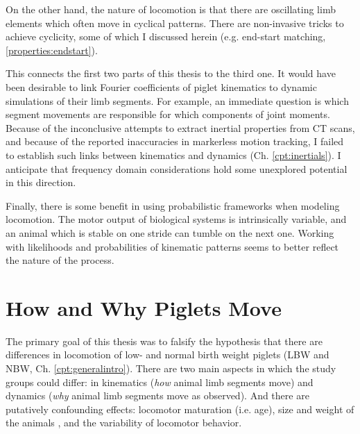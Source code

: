 \begin{change}
On the other hand, the nature of locomotion is that there are oscillating limb elements which often move in cyclical patterns.
There are non-invasive tricks to achieve cyclicity, some of which I discussed herein (e.g. end-start matching, \ref{properties:endstart}).


This connects the first two parts of this thesis to the third one.
It would have been desirable to link Fourier coefficients of piglet kinematics to dynamic simulations of their limb segments.
For example, an immediate question is which segment movements are responsible for which components of joint moments.
Because of the inconclusive attempts to extract inertial properties from CT scans, and because of the reported inaccuracies in markerless motion tracking, I failed to establish such links between kinematics and dynamics (Ch. \ref{cpt:inertials}).
I anticipate that frequency domain considerations hold some unexplored potential in this direction.


Finally, there is some benefit in using probabilistic frameworks when modeling locomotion.
The motor output of biological systems is intrinsically variable, and an animal which is stable on one stride can tumble on the next one.
Working with likelihoods and probabilities of kinematic patterns seems to better reflect the nature of the process.
\end{change}
\section{How and Why Piglets Move}
\label{sec:orga738ee9}
The primary goal of this thesis was to falsify the hypothesis that there are differences in locomotion of low- and normal birth weight piglets (LBW and NBW, Ch. \ref{cpt:generalintro}).
There are two main aspects in which the study groups could differ: in kinematics (\emph{how} animal limb segments move) and dynamics (\emph{why} animal limb segments move as observed).
And there are putatively confounding effects: locomotor maturation (i.e. age), size and weight of the animals \citep[i.e. physical appearance, cf.][]{Aerts2023}, and the variability of locomotor behavior.


